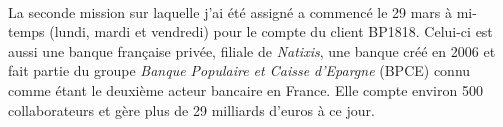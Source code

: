 \paragraph{}
La seconde mission sur laquelle j'ai été assigné a commencé le 29 mars à mi-temps (lundi, mardi et vendredi) pour le compte du client BP1818. Celui-ci est aussi une banque française privée, filiale de \textit{Natixis}, une banque créé en 2006 et fait partie du groupe \textit{Banque Populaire et Caisse d'Epargne} (BPCE) connu comme étant le deuxième acteur bancaire en France. Elle compte environ 500 collaborateurs et gère plus de 29 milliards d'euros à ce jour.

